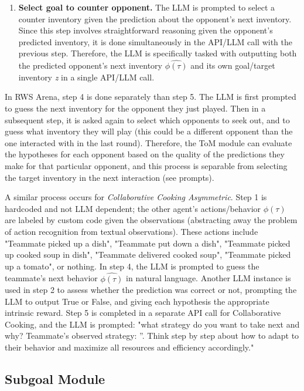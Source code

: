 \documentclass{article} %
\begin{document}
\begin{enumerate}
    \item \textbf{Select goal to counter opponent.} The LLM is prompted to select a counter inventory given the prediction about the opponent's next inventory. Since this step involves straightforward reasoning given the opponent's predicted inventory, it is done simultaneously in the API/LLM call with the previous step. Therefore, the LLM is specifically tasked with outputting both the predicted opponent's next inventory \( \hat{\phi(\tau)} \) and its own goal/target inventory \textit{z} in a single API/LLM call.
\end{enumerate}

In RWS Arena, step 4 is done separately than step 5. The LLM is first prompted to guess the next inventory for the opponent they just played. Then in a subsequent step, it is asked again to select which opponents to seek out, and to guess what inventory they will play (this could be a different opponent than the one interacted with in the last round). Therefore, the ToM module can evaluate the hypotheses for each opponent based on the quality of the predictions they make for that particular opponent, and this process is separable from selecting the target inventory in the next interaction (see prompts).

A similar process occurs for \textit{Collaborative Cooking Asymmetric}. Step 1 is hardcoded and not LLM dependent; the other agent's actions/behavior \( \phi(\tau) \) are labeled by custom code given the observations (abstracting away the problem of action recognition from textual observations). These actions include "Teammate picked up a dish", "Teammate put down a dish", "Teammate picked up cooked soup in dish", "Teammate delivered cooked soup", "Teammate picked up a tomato", or nothing. In step 4, the LLM is prompted to guess the teammate's next behavior \( \hat{\phi(\tau)} \) in natural language. Another LLM instance is used in step 2 to assess whether the prediction was correct or not, prompting the LLM to output True or False, and giving each hypothesis the appropriate intrinsic reward. Step 5 is completed in a separate API call for Collaborative Cooking, and the LLM is prompted: "what strategy do you want to take next and why? Teammate's observed strategy: ''. Think step by step about how to adapt to their behavior and maximize all resources and efficiency accordingly."

\subsection{Subgoal Module}
\end{document}
